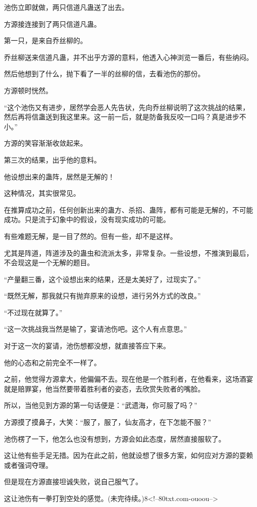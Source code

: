 \begin{this_body}
池伤立即就做，两只信道凡蛊送了出去。

方源接连接到了两只信道凡蛊。

第一只，是来自乔丝柳的。

乔丝柳送来信道凡蛊，并不出乎方源的意料，他透入心神浏览一番后，有些纳闷。

然后他想到了什么，抛下看了一半的丝柳的信，去看池伤的那份。

方源顿时恍然。

“这个池伤又有进步，居然学会恶人先告状，先向乔丝柳说明了这次挑战的结果，然后再将信蛊送到我这里来。这一前一后，就是防备我反咬一口吗？真是进步不小。”

方源的笑容渐渐收敛起来。

第三次的结果，出乎他的意料。

他设想出来的蛊阵，居然是无解的！

这种情况，其实很常见。

在推算成功之前，任何创新出来的蛊方、杀招、蛊阵，都有可能是无解的，不可能成功。只是流于幻象中的假设，没有现实成功的可能。

有些难题无解，是一目了然的。但有一些，却不是这样。

尤其是阵道，阵道涉及的蛊虫和流派太多，非常复杂。一些设想，不推演到最后，不会现这是一个无解的题目。

“产量翻三番，这个设想出来的结果，还是太美好了，过现实了。”

“既然无解，那我就只有抛弃原来的设想，进行另外方式的改良。”

“不过现在就算了。”

“这一次挑战我当然是输了，宴请池伤吧。这个人有点意思。”

对于这一次的宴请，池伤想都没想，就直接答应下来。

他的心态和之前完全不一样了。

之前，他觉得方源拿大，他偏偏不去。现在他是一个胜利者，在他看来，这场酒宴就是赔罪宴，他当然要带着胜利者的姿态，去欣赏失败者的嘴脸。

所以，当他见到方源的第一句话便是：“武遗海，你可服了吗？”

方源摸了摸鼻子，大笑：“服了，服了，仙友高才，在下怎能不服？”

池伤楞了一下，他怎么也没有想到，方源会如此态度，居然直接服软了。

这让他有些手足无措。因为在此之前，他就设想了很多方案，如何应对方源的耍赖或者强词夺理。

但是现在方源直接坦诚失败，说自己服气了。

这让池伤有一拳打到空处的感觉。(未完待续。)8<!--80txt.com-ouoou-->

\end{this_body}

